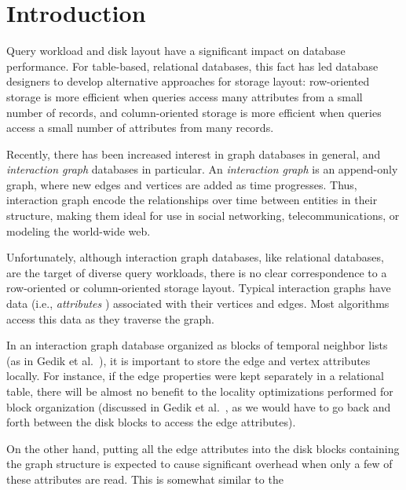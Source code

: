 \section{Introduction}

Query workload and disk layout have a significant impact on database
performance.  For table-based, relational databases, this fact has led database
designers to develop alternative approaches for storage layout: row-oriented
storage is more efficient when queries access many attributes from a small
number of records, and column-oriented storage is more efficient when queries
access a small number of attributes from many records.  

Recently, there has been increased interest in graph databases in general, and
\emph{interaction graph} databases in particular.  An \emph{interaction graph}
is an append-only graph, where new edges and vertices are added as time
progresses.  Thus, interaction graph encode the relationships over time between
entities in their structure, making them ideal for use in social networking,
telecommunications, or modeling the world-wide web.

Unfortunately, although interaction graph databases, like relational databases,
are the target of diverse query workloads, there is no clear correspondence to a
row-oriented or column-oriented storage layout.
Typical interaction graphs have data (i.e., \emph{attributes} ) associated with
their vertices and edges. Most algorithms access this data as they traverse the
graph.


In an interaction graph database organized as blocks of temporal neighbor lists
(as in Gedik et al.~\cite{gedik14}), it is important to store the edge and
vertex attributes locally. For  instance, if the edge properties were kept separately
in a relational table, there will be almost no benefit to the locality
optimizations performed for block organization (discussed in Gedik et
al.~\cite{gedik14}, as we would have to go back and forth between the disk
blocks to access the edge attributes).%


On the other hand, putting all the edge attributes into the disk blocks
containing the graph structure is expected to cause significant overhead when
only a few of these attributes are read. This is somewhat similar to the 





